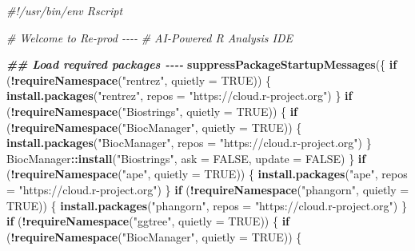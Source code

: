\documentclass[
  11pt,
]{article}
\newenvironment{Shaded}{\begin{snugshade}}{\end{snugshade}}
\newcommand{\AttributeTok}[1]{\textcolor[rgb]{0.13,0.29,0.53}{#1}}
\newcommand{\CommentTok}[1]{\textcolor[rgb]{0.56,0.35,0.01}{\textit{#1}}}
\newcommand{\ConstantTok}[1]{\textcolor[rgb]{0.56,0.35,0.01}{#1}}
\newcommand{\ControlFlowTok}[1]{\textcolor[rgb]{0.13,0.29,0.53}{\textbf{#1}}}
\newcommand{\DocumentationTok}[1]{\textcolor[rgb]{0.56,0.35,0.01}{\textbf{\textit{#1}}}}
\newcommand{\FunctionTok}[1]{\textcolor[rgb]{0.13,0.29,0.53}{\textbf{#1}}}
\newcommand{\NormalTok}[1]{#1}
\newcommand{\SpecialCharTok}[1]{\textcolor[rgb]{0.81,0.36,0.00}{\textbf{#1}}}
\newcommand{\StringTok}[1]{\textcolor[rgb]{0.31,0.60,0.02}{#1}}
\begin{document}
\begin{Shaded}
\begin{Highlighting}[]
\CommentTok{\#!/usr/bin/env Rscript}

\CommentTok{\# Welcome to Re{-}prod {-}{-}{-}{-}}
\CommentTok{\# AI{-}Powered R Analysis IDE}

\DocumentationTok{\#\# Load required packages {-}{-}{-}{-}}
\FunctionTok{suppressPackageStartupMessages}\NormalTok{(\{}
  \ControlFlowTok{if}\NormalTok{ (}\SpecialCharTok{!}\FunctionTok{requireNamespace}\NormalTok{(}\StringTok{"rentrez"}\NormalTok{, }\AttributeTok{quietly =} \ConstantTok{TRUE}\NormalTok{)) \{}
    \FunctionTok{install.packages}\NormalTok{(}\StringTok{"rentrez"}\NormalTok{, }\AttributeTok{repos =} \StringTok{"https://cloud.r{-}project.org"}\NormalTok{)}
\NormalTok{  \}}
  \ControlFlowTok{if}\NormalTok{ (}\SpecialCharTok{!}\FunctionTok{requireNamespace}\NormalTok{(}\StringTok{"Biostrings"}\NormalTok{, }\AttributeTok{quietly =} \ConstantTok{TRUE}\NormalTok{)) \{}
    \ControlFlowTok{if}\NormalTok{ (}\SpecialCharTok{!}\FunctionTok{requireNamespace}\NormalTok{(}\StringTok{"BiocManager"}\NormalTok{, }\AttributeTok{quietly =} \ConstantTok{TRUE}\NormalTok{)) \{}
      \FunctionTok{install.packages}\NormalTok{(}\StringTok{"BiocManager"}\NormalTok{, }\AttributeTok{repos =} \StringTok{"https://cloud.r{-}project.org"}\NormalTok{)}
\NormalTok{    \}}
\NormalTok{    BiocManager}\SpecialCharTok{::}\FunctionTok{install}\NormalTok{(}\StringTok{"Biostrings"}\NormalTok{, }\AttributeTok{ask =} \ConstantTok{FALSE}\NormalTok{, }\AttributeTok{update =} \ConstantTok{FALSE}\NormalTok{)}
\NormalTok{  \}}
  \ControlFlowTok{if}\NormalTok{ (}\SpecialCharTok{!}\FunctionTok{requireNamespace}\NormalTok{(}\StringTok{"ape"}\NormalTok{, }\AttributeTok{quietly =} \ConstantTok{TRUE}\NormalTok{)) \{}
    \FunctionTok{install.packages}\NormalTok{(}\StringTok{"ape"}\NormalTok{, }\AttributeTok{repos =} \StringTok{"https://cloud.r{-}project.org"}\NormalTok{)}
\NormalTok{  \}}
  \ControlFlowTok{if}\NormalTok{ (}\SpecialCharTok{!}\FunctionTok{requireNamespace}\NormalTok{(}\StringTok{"phangorn"}\NormalTok{, }\AttributeTok{quietly =} \ConstantTok{TRUE}\NormalTok{)) \{}
    \FunctionTok{install.packages}\NormalTok{(}\StringTok{"phangorn"}\NormalTok{, }\AttributeTok{repos =} \StringTok{"https://cloud.r{-}project.org"}\NormalTok{)}
\NormalTok{  \}}
  \ControlFlowTok{if}\NormalTok{ (}\SpecialCharTok{!}\FunctionTok{requireNamespace}\NormalTok{(}\StringTok{"ggtree"}\NormalTok{, }\AttributeTok{quietly =} \ConstantTok{TRUE}\NormalTok{)) \{}
    \ControlFlowTok{if}\NormalTok{ (}\SpecialCharTok{!}\FunctionTok{requireNamespace}\NormalTok{(}\StringTok{"BiocManager"}\NormalTok{, }\AttributeTok{quietly =} \ConstantTok{TRUE}\NormalTok{)) \{}

\end{Highlighting}
\end{Shaded}
\end{document}
